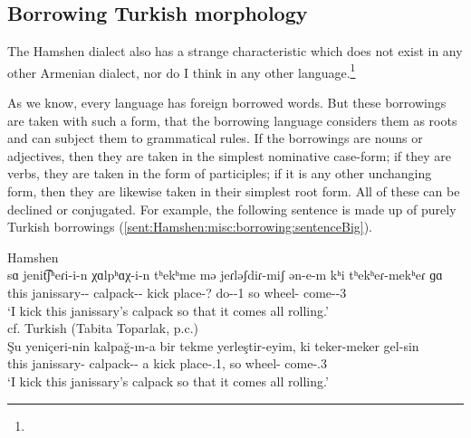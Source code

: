 \subsection{Borrowing Turkish morphology}

The Hamshen dialect also has a strange characteristic which does not exist in any other Armenian dialect, nor do I think in any other language.\footnote{}


As we know, every language has foreign borrowed words. But these borrowings are taken with such a form, that the borrowing language considers them as roots and can subject them to grammatical rules. If the borrowings are nouns or adjectives, then they are taken in the simplest nominative case-form; if they are verbs, they are taken in the form of participles; if it is any other unchanging form, then they are likewise taken in their simplest root form. All of these can be declined or conjugated. For example, the following sentence is made up of purely Turkish borrowings (\ref{sent:Hamshen:misc:borrowing:sentenceBig}). 

\begin{exe}
	\ex \begin{xlist}
		\ex Hamshen \label{sent:Hamshen:misc:borrowing:sentenceBig} \\
		\gll sɑ jenit͡ʃʰeɾi-i-n χɑlpʰɑχ-i-n tʰekʰme mə jeɾləʃdiɾ-miʃ ən-e-m kʰi tʰekʰeɾ-mekʰeɾ ɡɑ \\ 
		this janissary-{\gen}-{} calpack-{\dat}-{} kick {\indf} place-? do-{\thgloss}-1{\sg} so wheel-{\echo} come-{\thgloss}-3{\sg}\\ 
		\trans `I kick this janissary's calpack so that it comes all rolling.' \\ 
		\ex cf. Turkish  (Tabita Toparlak, p.c.) \\
		\gll Şu yeniçeri-nin kalpağ-ın-a bir tekme yerleştir-eyim, ki teker-meker gel-sin \\ 
		this janissary-{\gen} calpack-{\poss}-{\dat} a kick place-{\opt}.1{\sg}, so wheel-{\echo} come-{\imp}.3{\sg} \\ 
		\trans `I kick this janissary's calpack so that it comes all rolling.' 
	\end{xlist}
\end{exe}



